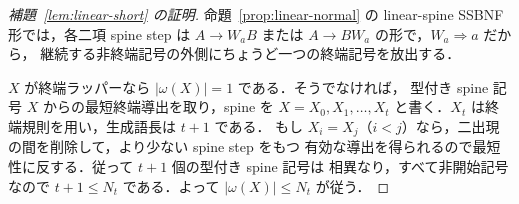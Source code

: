 \documentclass[11pt,a4paper]{ltjsarticle}
\theoremstyle{remark}
\theoremstyle{plain}
\begin{document}
\begin{proof}[補題~\ref{lem:linear-short} の証明]
命題~\ref{prop:linear-normal} の linear-spine SSBNF 形では，各二項 spine step は
$A\to W_aB$ または $A\to BW_a$ の形で，$W_a\Rightarrow a$ だから，
継続する非終端記号の外側にちょうど一つの終端記号を放出する．

$X$ が終端ラッパーなら $|\omega(X)|=1$ である．そうでなければ，
型付き spine 記号 $X$ からの最短終端導出を取り，spine を
$X=X_0,X_1,\ldots,X_t$ と書く．$X_t$ は終端規則を用い，生成語長は $t+1$ である．
もし $X_i=X_j$（$i<j$）なら，二出現の間を削除して，より少ない spine step をもつ
有効な導出を得られるので最短性に反する．従って $t+1$ 個の型付き spine 記号は
相異なり，すべて非開始記号なので $t+1\le N_t$ である．よって
$|\omega(X)|\le N_t$ が従う．
\end{proof}
\end{document}
